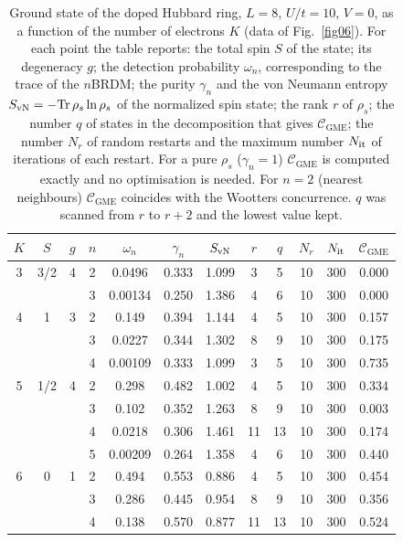 \documentclass[12pt]{article}
\begin{document}
\begin{table}
\caption{Ground state of the doped Hubbard ring, $L=8$, $U/t=10$, $V=0$, as a function of the number of electrons $K$ (data of Fig.~\ref{fig06}). For each point the table reports: the total spin $S$ of the state; its degeneracy $g$; the detection probability $\omega_n$, corresponding to the trace of the $n$BRDM; the purity $\gamma_n$ and the von Neumann entropy $S_{\rm vN}=-\mathrm{Tr}\,\rho_s\ln\rho_s$ of the normalized spin state; the rank $r$ of $\rho_s$; the number $q$ of states in the decomposition that gives $\mathcal{C}_{\mathrm{GME}}$; the number $N_r$ of random restarts and the maximum number $N_{\rm it}$ of iterations of each restart. For a pure $\rho_s$ ($\gamma_n=1$) $\mathcal{C}_{\mathrm{GME}}$ is computed exactly and no optimisation is needed. For $n=2$ (nearest neighbours) $\mathcal{C}_{\mathrm{GME}}$ coincides with the Wootters concurrence. $q$ was scanned from $r$ to $r+2$ and the lowest value kept.}
\label{tab:doped_K}
\begin{ruledtabular}
\begin{tabular}{cccccccccccc}
$K$ & $S$ & $g$ & $n$ & $\omega_n$ & $\gamma_n$ & $S_{\rm vN}$ & $r$ & $q$ & $N_r$ & $N_{\rm it}$ & $\mathcal{C}_{\mathrm{GME}}$ \\
\hline
3 & 3/2 & 4 & 2 & 0.0496 & 0.333 & 1.099 & 3 & 5 & 10 & 300 & 0.000 \\
 & &  & 3 & 0.00134 & 0.250 & 1.386 & 4 & 6 & 10 & 300 & 0.000 \\
\hline
4 & 1 & 3 & 2 & 0.149 & 0.394 & 1.144 & 4 & 5 & 10 & 300 & 0.157 \\
 & &  & 3 & 0.0227 & 0.344 & 1.302 & 8 & 9 & 10 & 300 & 0.175 \\
 & &  & 4 & 0.00109 & 0.333 & 1.099 & 3 & 5 & 10 & 300 & 0.735 \\
\hline
5 & 1/2 & 4 & 2 & 0.298 & 0.482 & 1.002 & 4 & 5 & 10 & 300 & 0.334 \\
 & &  & 3 & 0.102 & 0.352 & 1.263 & 8 & 9 & 10 & 300 & 0.003 \\
 & &  & 4 & 0.0218 & 0.306 & 1.461 & 11 & 13 & 10 & 300 & 0.174 \\
 & &  & 5 & 0.00209 & 0.264 & 1.358 & 4 & 6 & 10 & 300 & 0.440 \\
\hline
6 & 0 & 1 & 2 & 0.494 & 0.553 & 0.886 & 4 & 5 & 10 & 300 & 0.454 \\
 & &  & 3 & 0.286 & 0.445 & 0.954 & 8 & 9 & 10 & 300 & 0.356 \\
 & &  & 4 & 0.138 & 0.570 & 0.877 & 11 & 13 & 10 & 300 & 0.524 \\

\end{tabular}
\end{ruledtabular}
\end{table}
\end{document}
